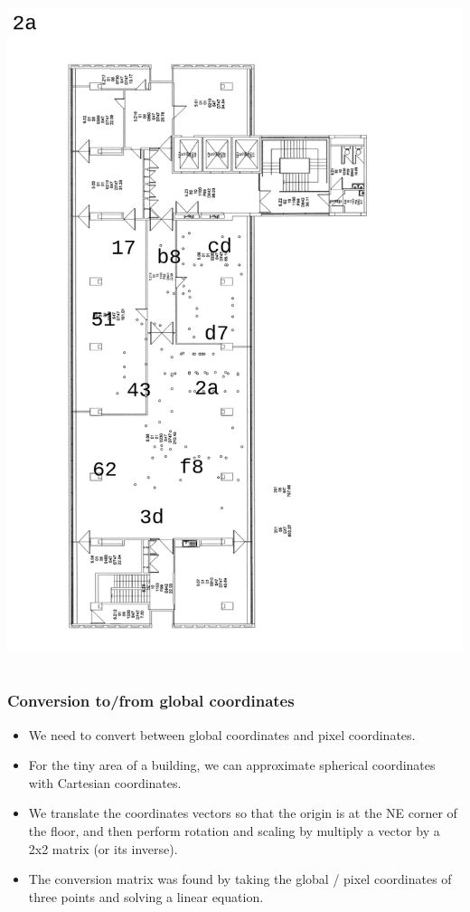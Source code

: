 \documentclass{beamer}
\begin{document}
\begin{frame}
\begin{columns}
\includegraphics[width=\linewidth]{images/2a_read.png}
\end{columns}
\end{frame}

\begin{frame}
\frametitle{Conversion to/from global coordinates}
\begin{itemize}
\item We need to convert between global coordinates and pixel coordinates.
\item For the tiny area of a building, we can approximate spherical coordinates with Cartesian coordinates.
\item We translate the coordinates vectors so that the origin is at the NE corner of the floor, and then perform rotation and scaling by multiply a vector by a 2x2 matrix (or its inverse).
\item The conversion matrix was found by taking the global / pixel coordinates of three points and solving a linear equation.
\end{itemize}
\end{frame}
\end{document}
